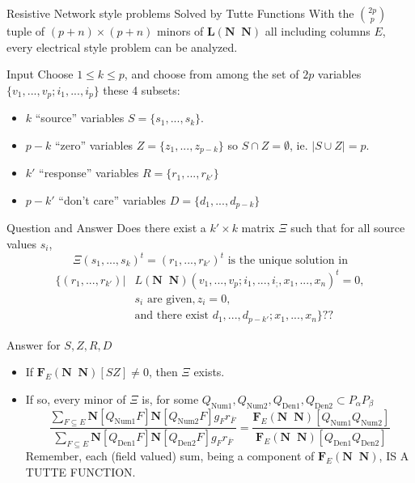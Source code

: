 \documentclass{beamer}
\newcommand{\ext}[1]{\ensuremath{\mathbf{#1}}}
\begin{document}
\begin{frame}{Resistive Network style problems Solved by Tutte Functions}
  With the $\binom{2p}{p}$ tuple of $(p+n)\times(p+n)$
  minors of $\ext{L}(\ext{N}\;\;\ext{N})$ all including columns $E$, every electrical style
  problem can be analyzed.
  \begin{block}{Input}
    Choose $1\le k\le p$, and choose from among the set of $2p$ variables
    $\{v_1,...,v_p;i_1,...,i_p\}$ these 4 subsets:
    \begin{itemize}
    \item $k$ ``source'' variables $S=\{s_1,...,s_k\}$.
    \item $p-k$ ``zero'' variables $Z=\{z_1,...,z_{p-k}\}$ so $S\cap Z=\emptyset$, ie. $|S\cup Z|=p$.
    \item $k'$ ``response'' variables $R=\{r_1,...,r_{k'}\}$
    \item $p-k'$ ``don't care'' variables $D=\{d_1,...,d_{p-k}\}$ 
    \end{itemize}
  \end{block}
\end{frame}

\begin{frame}{Question and Answer}
    Does there exist a $k'\times k$ matrix $\Xi$ such that for all source values $s_i$,
    \[
    \Xi(s_1,...,s_k)^t = (r_1,...,r_{k'})^t \text{\ is the unique solution in}
    \]
    \[
    \begin{split}    \{ (r_1,...,r_{k'}) |& L( \ext{N}\;\;\ext{N} )(v_1,...,v_p;i_1,...,i_;,x_1,...,x_n)^t = 0,\\
      & s_i \text{\ are given}, z_i=0,\\
      &\text{and there exist\ } d_1,...,d_{p-k'};x_1,...,x_n\}??
    \end{split}
    \]
  \begin{block}{Answer for $S,Z,R,D$}
    \begin{itemize}
     \item
        If $\ext{F}_E(\ext{N}\;\;\ext{N})[SZ]\not=0$, then $\Xi$ exists.

      \item
        If so, every minor of $\Xi$ is, for some
        $Q_{\text{Num1}},Q_{\text{Num2}},Q_{\text{Den1}},Q_{\text{Den2}}\subset P_\alpha P_\beta$
        \[
        \frac{\sum_{F\subseteq E}\ext{N}[Q_{\text{Num1}}F]\ext{N}[Q_{\text{Num2}}F]g_Fr_{\overline{F}}}
             {\sum_{F\subseteq E}\ext{N}[Q_{\text{Den1}}F]\ext{N}[Q_{\text{Den2}}F]g_Fr_{\overline{F}}}
             =
             \frac{\ext{F}_E(\ext{N}\;\;\ext{N})[Q_{\text{Num1}}Q_{\text{Num2}}]}
                 {\ext{F}_E(\ext{N}\;\;\ext{N})[Q_{\text{Den1}}Q_{\text{Den2}}]}
          \]
          Remember, each (field valued) sum, being a component of
          $\ext{F}_E(\ext{N}\;\;\ext{N})$,  IS A TUTTE FUNCTION.
    \end{itemize}
  \end{block}
\end{frame}
          
\end{document}
